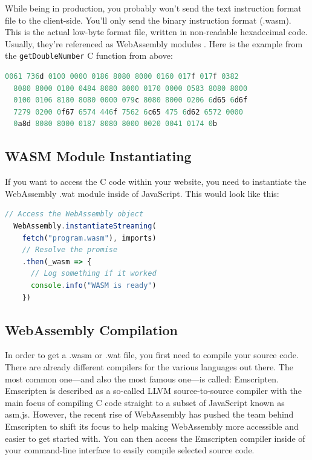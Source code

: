 \documentclass[10pt]{article}  %
\begin{document}
\begin{sloppypar}
  While being in production, you probably won’t send the text instruction format file to the client-side. You’ll only send the binary instruction format (.wasm). This is the actual low-byte format file, written in non-readable hexadecimal code. Usually, they’re referenced as WebAssembly modules \citep{mozilla_webassembly_2023}. Here is the example from the \lstinline{getDoubleNumber} C function from above:

  \vspace{7pt}
  \begin{lstlisting}[language=C, caption=Code example from above compiled into the WebAssembly \\ Binary Instruction Format., label=lst:binary-example]
  0061 736d 0100 0000 0186 8080 8000 0160 017f 017f 0382
  8080 8000 0100 0484 8080 8000 0170 0000 0583 8080 8000
  0100 0106 8180 8080 0000 079c 8080 8000 0206 6d65 6d6f
  7279 0200 0f67 6574 446f 7562 6c65 475 6d62 6572 0000
  0a8d 8080 8000 0187 8080 8000 0020 0041 0174 0b\end{lstlisting}

  \subsection{WASM Module Instantiating}
  \label{sec:webassembly-module-instantiating}

  If you want to access the C code within your website, you need to instantiate the WebAssembly .wat module inside of JavaScript. This would look like this:

  \vspace{7pt}
  \begin{lstlisting}[language=JavaScript, caption=Instantiate the .wasm module in JavaScript., label=lst:javascript-example]
  // Access the WebAssembly object
  WebAssembly.instantiateStreaming(
    fetch("program.wasm"), imports)
    // Resolve the promise
    .then(_wasm => {
      // Log something if it worked
      console.info("WASM is ready")
    })\end{lstlisting}

  \subsection{WebAssembly Compilation}
  \label{sec:webassembly-compilation}

  In order to get a .wasm or .wat file, you first need to compile your source code. There are already different compilers for the various languages out there. The most common one—and also the most famous one—is called: Emscripten. Emscripten is described as a so-called LLVM source-to-source compiler with the main focus of compiling C code straight to a subset of JavaScript known as asm.js. However, the recent rise of WebAssembly has pushed the team behind Emscripten to shift its focus to help making WebAssembly more accessible and easier to get started with. You can then access the Emscripten compiler inside of your command-line interface to easily compile selected source code.


\end{sloppypar}
\end{document}
